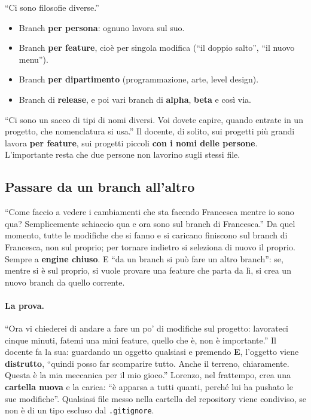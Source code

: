 ``Ci sono filosofie diverse.''
\begin{itemize}
  \item Branch \textbf{per persona}: ognuno lavora sul suo.
  \item Branch \textbf{per feature}, cioè per singola modifica (``il doppio
        salto'', ``il nuovo menu'').
  \item Branch \textbf{per dipartimento} (programmazione, arte, level design).
  \item Branch di \textbf{release}, e poi vari branch di \textbf{alpha},
        \textbf{beta} e così via.
\end{itemize}
``Ci sono un sacco di tipi di nomi diversi. Voi dovete capire, quando entrate in
un progetto, che nomenclatura si usa.'' Il docente, di solito, sui progetti più
grandi lavora \textbf{per feature}, sui progetti piccoli \textbf{con i nomi
delle persone}. L'importante resta che due persone non lavorino sugli stessi
file.

\subsection{Passare da un branch all'altro}

``Come faccio a vedere i cambiamenti che sta facendo Francesca mentre io sono
qua? Semplicemente schiaccio qua e ora sono sul branch di Francesca.'' Da quel
momento, tutte le modifiche che si fanno e si caricano finiscono sul branch di
Francesca, non sul proprio; per tornare indietro si seleziona di nuovo il
proprio. Sempre a \textbf{engine chiuso}. E ``da un branch si può fare un altro
branch'': se, mentre si è sul proprio, si vuole provare una feature che parta da
lì, si crea un nuovo branch da quello corrente.

\paragraph{La prova.} ``Ora vi chiederei di andare a fare un po' di modifiche
sul progetto: lavorateci cinque minuti, fatemi una mini feature, quello che è,
non è importante.'' Il docente fa la sua: guardando un oggetto qualsiasi e
premendo \textbf{E}, l'oggetto viene \textbf{distrutto}, ``quindi posso far
scomparire tutto. Anche il terreno, chiaramente. Questa è la mia meccanica per
il mio gioco.'' Lorenzo, nel frattempo, crea una \textbf{cartella nuova} e la
carica: ``è apparsa a tutti quanti, perché lui ha pushato le sue modifiche''.
Qualsiasi file messo nella cartella del repository viene condiviso, se non è di
un tipo escluso dal \texttt{.gitignore}.

